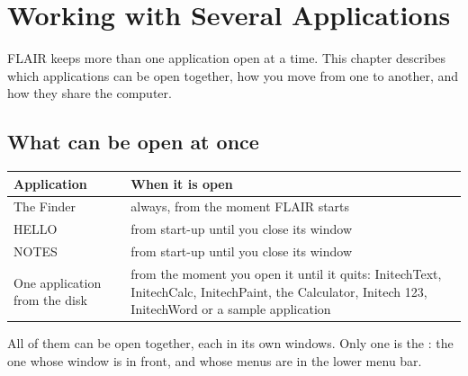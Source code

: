 \chapter{Working with Several Applications}
\label{ch:multi}

FLAIR keeps more than one application open at a time.  This chapter
describes which applications can be open together, how you move from one to
another, and how they share the computer.

\section{What can be open at once}
\begin{center}\small
\begin{tabular}{@{}p{32mm}p{67mm}@{}}
\textbf{Application} & \textbf{When it is open}\\\hline
The Finder & always, from the moment FLAIR starts\\
HELLO & from start-up until you close its window\\
NOTES & from start-up until you close its window\\
One application from the disk & from the moment you open it until it
quits: InitechText, InitechCalc, InitechPaint, the Calculator, Initech
123, InitechWord or a sample application\\
\end{tabular}
\end{center}
All of them can be open together, each in its own windows.  Only one is
the : the one whose window is in front, and whose
menus are in the lower menu bar.

